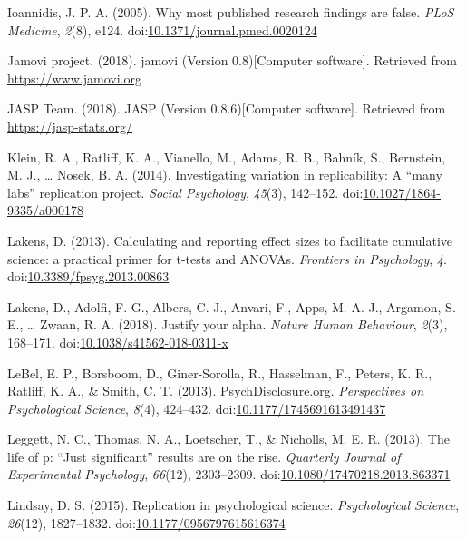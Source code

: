\documentclass[english,,man,mask]{apa6}
\theoremstyle{definition}
\theoremstyle{definition}
\theoremstyle{definition}
\theoremstyle{remark}
\begin{document}
\hypertarget{ref-Ioannidis2005}{}
Ioannidis, J. P. A. (2005). Why most published research findings are
false. \emph{PLoS Medicine}, \emph{2}(8), e124.
doi:\href{https://doi.org/10.1371/journal.pmed.0020124}{10.1371/journal.pmed.0020124}

\hypertarget{ref-jamovi2018}{}
Jamovi project. (2018). jamovi (Version 0.8){[}Computer software{]}.
Retrieved from \url{https://www.jamovi.org}

\hypertarget{ref-JASP2018}{}
JASP Team. (2018). JASP (Version 0.8.6){[}Computer software{]}.
Retrieved from \url{https://jasp-stats.org/}

\hypertarget{ref-Klein2014c}{}
Klein, R. A., Ratliff, K. A., Vianello, M., Adams, R. B., Bahník, Š.,
Bernstein, M. J., \ldots{} Nosek, B. A. (2014). Investigating variation
in replicability: A ``many labs'' replication project. \emph{Social
Psychology}, \emph{45}(3), 142--152.
doi:\href{https://doi.org/10.1027/1864-9335/a000178}{10.1027/1864-9335/a000178}

\hypertarget{ref-Lakens2013}{}
Lakens, D. (2013). Calculating and reporting effect sizes to facilitate
cumulative science: a practical primer for t-tests and ANOVAs.
\emph{Frontiers in Psychology}, \emph{4}.
doi:\href{https://doi.org/10.3389/fpsyg.2013.00863}{10.3389/fpsyg.2013.00863}

\hypertarget{ref-Lakens2018}{}
Lakens, D., Adolfi, F. G., Albers, C. J., Anvari, F., Apps, M. A. J.,
Argamon, S. E., \ldots{} Zwaan, R. A. (2018). Justify your alpha.
\emph{Nature Human Behaviour}, \emph{2}(3), 168--171.
doi:\href{https://doi.org/10.1038/s41562-018-0311-x}{10.1038/s41562-018-0311-x}

\hypertarget{ref-LeBel2013}{}
LeBel, E. P., Borsboom, D., Giner-Sorolla, R., Hasselman, F., Peters, K.
R., Ratliff, K. A., \& Smith, C. T. (2013). PsychDisclosure.org.
\emph{Perspectives on Psychological Science}, \emph{8}(4), 424--432.
doi:\href{https://doi.org/10.1177/1745691613491437}{10.1177/1745691613491437}

\hypertarget{ref-Leggett}{}
Leggett, N. C., Thomas, N. A., Loetscher, T., \& Nicholls, M. E. R.
(2013). The life of p: ``Just significant'' results are on the rise.
\emph{Quarterly Journal of Experimental Psychology}, \emph{66}(12),
2303--2309.
doi:\href{https://doi.org/10.1080/17470218.2013.863371}{10.1080/17470218.2013.863371}

\hypertarget{ref-Lindsay2015}{}
Lindsay, D. S. (2015). Replication in psychological science.
\emph{Psychological Science}, \emph{26}(12), 1827--1832.
doi:\href{https://doi.org/10.1177/0956797615616374}{10.1177/0956797615616374}
\end{document}
